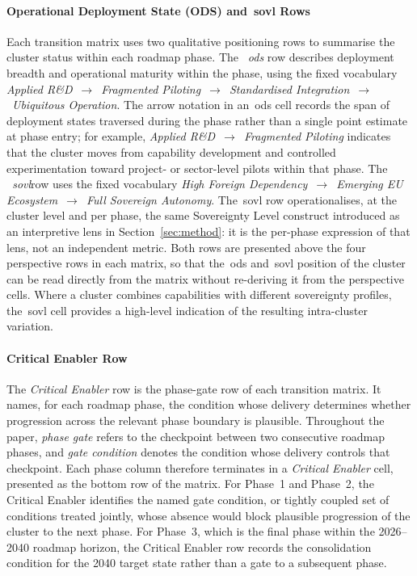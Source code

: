 \documentclass{ieeeaccess}
\begin{document}
\paragraph{Operational Deployment State (ODS) and~\acrfull{sovl} Rows}
Each transition matrix uses two qualitative positioning rows to summarise the cluster status within each roadmap phase. The \emph{~\gls{ods}} row describes deployment breadth and operational maturity within the phase, using the fixed vocabulary \textit{Applied R\&D}~$\rightarrow$~\textit{Fragmented Piloting}~$\rightarrow$~\textit{Standardised Integration}~$\rightarrow$~\textit{Ubiquitous Operation}. The arrow notation in an~\gls{ods} cell records the span of deployment states traversed during the phase rather than a single point estimate at phase entry; for example, \textit{Applied R\&D}~$\rightarrow$~\textit{Fragmented Piloting} indicates that the cluster moves from capability development and controlled experimentation toward project- or sector-level pilots within that phase. The \emph{~\gls{sovl}}row uses the fixed vocabulary \textit{High Foreign Dependency}~$\rightarrow$~\textit{Emerging EU Ecosystem}~$\rightarrow$~\textit{Full Sovereign Autonomy}. The~\gls{sovl} row operationalises, at the cluster level and per phase, the same Sovereignty Level construct introduced as an interpretive lens in Section~\ref{sec:method}: it is the per-phase expression of that lens, not an independent metric. Both rows are presented above the four perspective rows in each matrix, so that the~\gls{ods} and~\gls{sovl} position of the cluster can be read directly from the matrix without re-deriving it from the perspective cells. Where a cluster combines capabilities with different sovereignty profiles, the~\gls{sovl} cell provides a high-level indication of the resulting intra-cluster variation.

\paragraph{Critical Enabler Row}
The \emph{Critical Enabler} row is the phase-gate row of each transition matrix. It names, for each roadmap phase, the condition whose delivery determines whether progression across the relevant phase boundary is plausible. Throughout the paper, \emph{phase gate} refers to the checkpoint between two consecutive roadmap phases, and \emph{gate condition} denotes the condition whose delivery controls that checkpoint. Each phase column therefore terminates in a \emph{Critical Enabler} cell, presented as the bottom row of the matrix. For Phase~1 and Phase~2, the Critical Enabler identifies the named gate condition, or tightly coupled set of conditions treated jointly, whose absence would block plausible progression of the cluster to the next phase. For Phase~3, which is the final phase within the 2026--2040 roadmap horizon, the Critical Enabler row records the consolidation condition for the 2040 target state rather than a gate to a subsequent phase.
\end{document}
